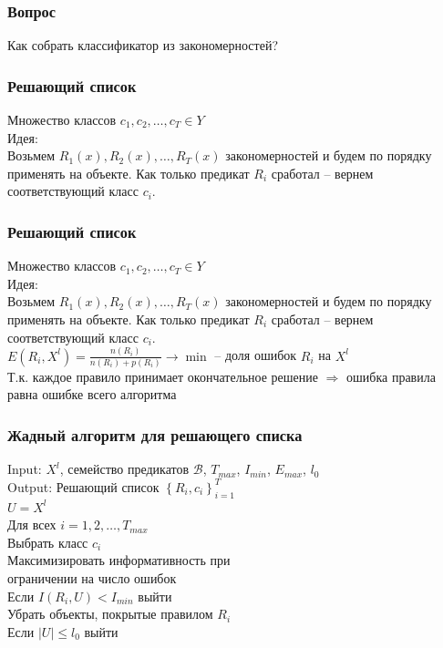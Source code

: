 \documentclass[12pt]{beamer}
\begin{document}
\begin{frame}\frametitle{Вопрос}
Как собрать классификатор из закономерностей?
\end{frame}

\begin{frame}\frametitle{Решающий список}
Множество классов $c_1,c_2,\dots, c_T \in Y$\\
\vspace{5mm}
Идея:\\
Возьмем $R_1(x), R_2(x), \dots, R_T(x)$ закономерностей и будем по порядку применять на объекте. 
Как только предикат $R_i$ сработал -- вернем соответствующий класс $c_i$.
\end{frame}

\begin{frame}\frametitle{Решающий список}
Множество классов $c_1,c_2,\dots, c_T \in Y$\\
\vspace{5mm}
Идея:\\
Возьмем $R_1(x), R_2(x), \dots, R_T(x)$ закономерностей и будем по порядку применять на объекте. 
Как только предикат $R_i$ сработал -- вернем соответствующий класс $c_i$.\\
\vspace{5mm}
$E(R_i, X^l) = \frac{n(R_i)}{n(R_i)+p(R_i)} \rightarrow \min$ -- доля ошибок $R_i$ на $X^l$\\
Т.к. каждое правило принимает окончательное решение $\Rightarrow$ ошибка правила равна ошибке всего алгоритма
\end{frame}

\begin{frame}\frametitle{Жадный алгоритм для решающего списка}
Input: $X^l$, семейство предикатов $\mathcal{B}$, $T_{max}$, $I_{min}$, $E_{max}$, $l_0$\\
Output: Решающий список $\left\{ R_i, c_i \right\}_{i=1}^T$\\
\vspace{5mm}
$U = X^l$\\
Для всех $i = 1,2,\dots,T_{max}$\\
\hspace{10mm} Выбрать класс $c_i$\\
\hspace{10mm} Максимизировать информативность при \\
\hspace{40mm} ограничении на число ошибок\\
\hspace{10mm} Если $I(R_i, U) < I_{min}$ выйти\\
\hspace{10mm} Убрать объекты, покрытые правилом $R_i$\\
\hspace{10mm} Если $\vert U \vert \leq l_0$ выйти
\end{frame}
\end{document}
